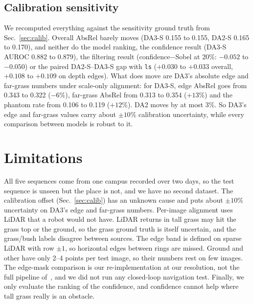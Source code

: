 \documentclass[conference]{IEEEtran}
\newcommand{\absrel}{AbsRel}
\begin{document}
\subsection{Calibration sensitivity}\label{sec:sens}
We recomputed everything against the sensitivity ground truth from Sec.~\ref{sec:calib}. Overall \absrel{} barely moves (DA3-S 0.155 to 0.155, DA2-S 0.165 to 0.170), and neither do the model ranking, the confidence result (DA3-S AUROC 0.882 to 0.879), the filtering result (confidence$-$Sobel at 20\%: $-0.052$ to $-0.050$) or the paired DA2-S--DA3-S gap with \texttt{ls} ($+0.030$ to $+0.033$ overall, $+0.108$ to $+0.109$ on depth edges). What does move are DA3's absolute edge and far-grass numbers under scale-only alignment: for DA3-S, edge \absrel{} goes from 0.343 to 0.322 ($-6$\%), far-grass \absrel{} from 0.313 to 0.354 ($+13$\%) and the phantom rate from 0.106 to 0.119 ($+12$\%). DA2 moves by at most 3\%. So DA3's edge and far-grass values carry about $\pm10$\% calibration uncertainty, while every comparison between models is robust to it.

\section{Limitations}
All five sequences come from one campus recorded over two days, so the test sequence is unseen but the place is not, and we have no second dataset. The calibration offset (Sec.~\ref{sec:calib}) has an unknown cause and puts about $\pm10$\% uncertainty on DA3's edge and far-grass numbers. Per-image alignment uses LiDAR that a robot would not have. LiDAR returns in tall grass may hit the grass top or the ground, so the grass ground truth is itself uncertain, and the grass/bush labels disagree between sources. The edge band is defined on sparse LiDAR with row $\pm1$, so horizontal edges between rings are missed. Ground and other have only 2--4 points per test image, so their numbers rest on few images. The edge-mask comparison is our re-implementation at our resolution, not the full pipeline of~\cite{offroadnav}, and we did not run any closed-loop navigation test. Finally, we only evaluate the ranking of the confidence, and confidence cannot help where tall grass really is an obstacle.
\end{document}
